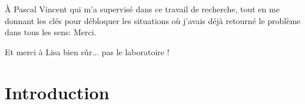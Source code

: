 \documentclass[12pt,maitrise,nobabel,anglais,twoside,initial]{template/dms}
\numberwithin{equation}{section}
\numberwithin{table}{chapter}
\numberwithin{figure}{chapter}
\begin{document}
À Pascal Vincent qui m'a supervisé dans ce travail de recherche, tout en me donnant les clés pour débloquer les situations où j'avais déjà retourné le problème dans tous les sens: Merci.

Et merci à Lisa bien sûr... pas le laboratoire !


\NoChapterPageNumber 
\cleardoublepage



\chapter*{Introduction}





\




% 


%
%
\end{document}
